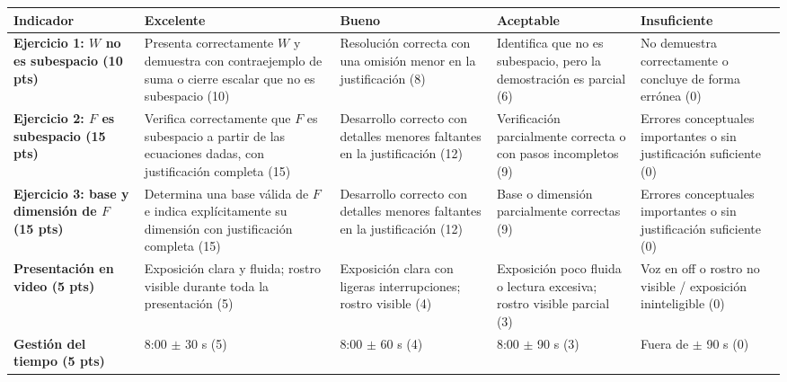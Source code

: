 \documentclass[a4,11pt]{aleph-notas}
\begin{document}
\begin{landscape}
\begin{center}\footnotesize
\begin{tabular}{p{5cm}p{4cm}p{4cm}p{4cm}p{4cm}}
\toprule
\textbf{Indicador} & \textbf{Excelente} & \textbf{Bueno} & \textbf{Aceptable} & \textbf{Insuficiente} \\ \midrule
\textbf{Ejercicio 1: $W$ no es subespacio (10 pts)} & Presenta correctamente $W$ y demuestra con contraejemplo de suma o cierre escalar que no es subespacio (10) & Resolución correcta con una omisión menor en la justificación (8) & Identifica que no es subespacio, pero la demostración es parcial (6) & No demuestra correctamente o concluye de forma errónea (0) \\ \midrule
\textbf{Ejercicio 2: $F$ es subespacio (15 pts)} & Verifica correctamente que $F$ es subespacio a partir de las ecuaciones dadas, con justificación completa (15) & Desarrollo correcto con detalles menores faltantes en la justificación (12) & Verificación parcialmente correcta o con pasos incompletos (9) & Errores conceptuales importantes o sin justificación suficiente (0) \\ \midrule
\textbf{Ejercicio 3: base y dimensión de $F$ (15 pts)} & Determina una base válida de $F$ e indica explícitamente su dimensión con justificación completa (15) & Desarrollo correcto con detalles menores faltantes en la justificación (12) & Base o dimensión parcialmente correctas (9) & Errores conceptuales importantes o sin justificación suficiente (0) \\ \midrule
\textbf{Presentación en video (5 pts)}
& Exposición clara y fluida; rostro visible durante toda la presentación (5)
& Exposición clara con ligeras interrupciones; rostro visible (4)
& Exposición poco fluida o lectura excesiva; rostro visible parcial (3)
& Voz en off o rostro no visible / exposición ininteligible (0) \\ \midrule
\textbf{Gestión del tiempo (5 pts)} & 8:00 $\pm$ 30 s (5) & 8:00 $\pm$ 60 s (4) & 8:00 $\pm$ 90 s (3) & Fuera de $\pm$ 90 s (0) \\ \bottomrule
\end{tabular}
\end{center}
\end{landscape}
\end{document}
